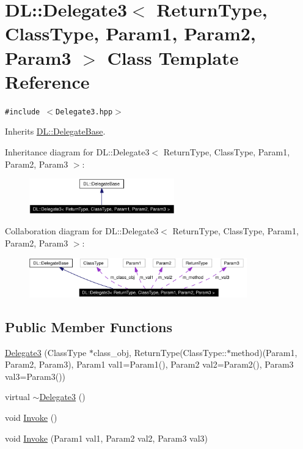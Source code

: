 \hypertarget{classDL_1_1Delegate3}{
\section{DL::Delegate3$<$ Return\-Type, Class\-Type, Param1, Param2, Param3 $>$ Class Template Reference}
\label{classDL_1_1Delegate3}
}
{\tt \#include $<$Delegate3.hpp$>$}

Inherits \hyperlink{classDL_1_1DelegateBase}{DL::Delegate\-Base}.

Inheritance diagram for DL::Delegate3$<$ Return\-Type, Class\-Type, Param1, Param2, Param3 $>$:\begin{figure}[H]
\begin{center}
\leavevmode
\includegraphics[width=178pt]{classDL_1_1Delegate3__inherit__graph}
\end{center}
\end{figure}
Collaboration diagram for DL::Delegate3$<$ Return\-Type, Class\-Type, Param1, Param2, Param3 $>$:\begin{figure}[H]
\begin{center}
\leavevmode
\includegraphics[width=267pt]{classDL_1_1Delegate3__coll__graph}
\end{center}
\end{figure}
\subsection*{Public Member Functions}
\begin{CompactItemize}
\item 
\hyperlink{classDL_1_1Delegate3_a0}{Delegate3} (Class\-Type $\ast$class\_\-obj, Return\-Type(Class\-Type::$\ast$method)(Param1, Param2, Param3), Param1 val1=Param1(), Param2 val2=Param2(), Param3 val3=Param3())
\item 
virtual \hyperlink{classDL_1_1Delegate3_a1}{$\sim$Delegate3} ()
\item 
void \hyperlink{classDL_1_1Delegate3_a2}{Invoke} ()
\item 
void \hyperlink{classDL_1_1Delegate3_a3}{Invoke} (Param1 val1, Param2 val2, Param3 val3)
\end{CompactItemize}
